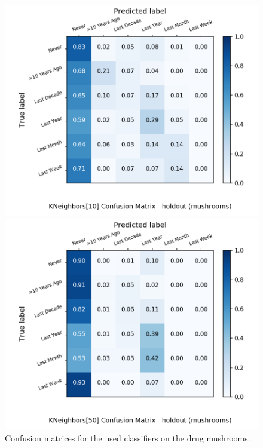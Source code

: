 \begin{figure}[H]
\begin{minipage}[b]{0.32\textwidth}
		\includegraphics[width=1.1\textwidth]{Plots/drugs/mushrooms_KNeighbors_10_balance_False_holdout.png}
  \end{minipage}
	\begin{minipage}[b]{0.32\textwidth}
		\includegraphics[width=1.1\textwidth]{Plots/drugs/mushrooms_KNeighbors_50_balance_False_holdout.png}
  \end{minipage}
	\caption{Confusion matrices for the used classifiers on the drug mushrooms.}
\end{figure}

